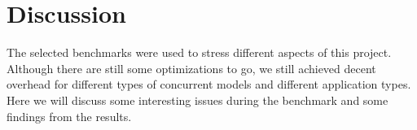 





\section{Discussion}
The selected benchmarks were used to stress different aspects of this project. Although there are still some optimizations to go, we still achieved decent overhead for different types of concurrent models and different application types. Here we will discuss some interesting issues during the benchmark and some findings from the results.

